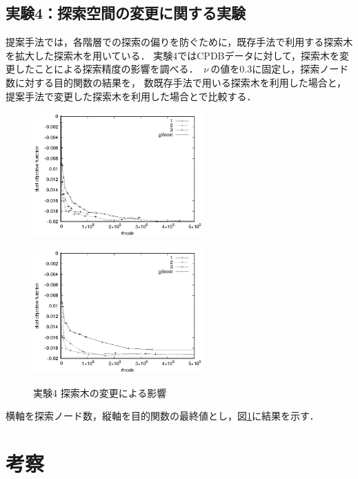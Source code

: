 \section{実験4：探索空間の変更に関する実験}
提案手法では，各階層での探索の偏りを防ぐために，既存手法で利用する探索木を拡大した探索木を用いている．
実験4ではCPDBデータに対して，探索木を変更したことによる探索精度の影響を調べる．
$\ \nu\ $の値を0.3に固定し，探索ノード数に対する目的関数の結果を，
数既存手法で用いる探索木を利用した場合と，提案手法で変更した探索木を利用した場合とで比較する．
\begin{figure}[t]
	\begin{minipage}{0.5\hsize}
		\begin{center}
			\includegraphics[width=65mm]{cpdb/purpose_node_3_tree.eps}
		\end{center}
		\label{fig:14}
	\end{minipage}
	\begin{minipage}{0.5\hsize}
		\begin{center}
			\includegraphics[width=65mm]{cpdb/purpose_node_3.eps}
		\end{center}
		\label{fig:15}
	\end{minipage}
	\caption{実験4 探索木の変更による影響}
	\label{tree}
\end{figure}
横軸を探索ノード数，縦軸を目的関数の最終値とし，図\ref{tree}に結果を示す．

\chapter{考察}
\label{考察}
